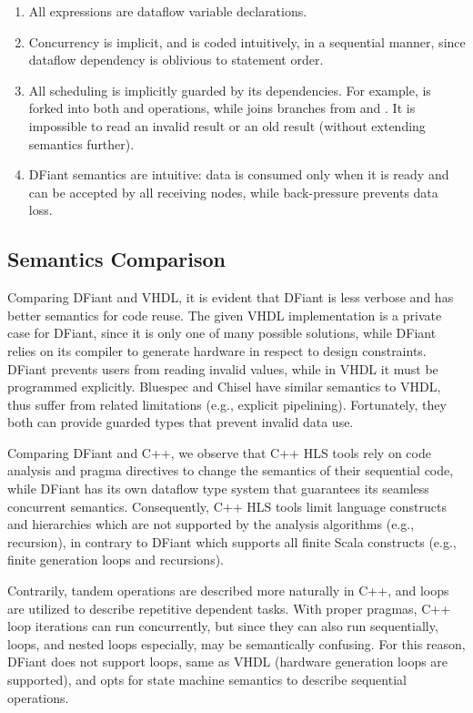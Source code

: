 \begin{enumerate}
  \item All expressions are dataflow variable declarations.
  \item Concurrency is implicit, and  is coded intuitively, in a sequential manner, since dataflow dependency is oblivious to statement order. 
  \item All scheduling is implicitly guarded by its dependencies. For example,  is forked into both  and  operations, while  joins branches from  and .
  It is impossible to read an invalid result or an old result (without extending semantics further).
  \item DFiant semantics are intuitive: data is consumed only when it is ready and can be accepted by all receiving nodes, while back-pressure prevents data loss. 
\end{enumerate} 
   

\subsection{Semantics Comparison}
Comparing DFiant and VHDL, it is evident that DFiant is less verbose and has better semantics for code reuse. The given VHDL implementation is a private case for DFiant, since it is only one of many possible solutions, while DFiant relies on its compiler to generate hardware in respect to design constraints. DFiant prevents  users from reading invalid values, while in VHDL it must be programmed explicitly. Bluespec and Chisel have similar semantics to VHDL, thus suffer from related limitations (e.g., explicit pipelining). Fortunately, they both can provide guarded types that prevent invalid data use.

Comparing DFiant and C++, we observe that C++ HLS tools rely on code analysis and pragma directives to change the semantics of their sequential code, while DFiant has its own dataflow type system that guarantees its seamless concurrent semantics. Consequently, C++ HLS tools limit language constructs and hierarchies which are not supported by the analysis algorithms (e.g., recursion), in contrary to DFiant which supports all finite Scala constructs (e.g., finite generation loops and recursions). 

Contrarily, tandem operations are described more naturally in C++, and loops are utilized to describe repetitive dependent tasks. With proper pragmas, C++ loop iterations can run concurrently, but since they can also run sequentially, loops, and nested loops especially, may be semantically confusing. For this reason, DFiant does not support loops, same as VHDL (hardware generation loops are supported), and opts for state machine semantics to describe sequential operations. %
